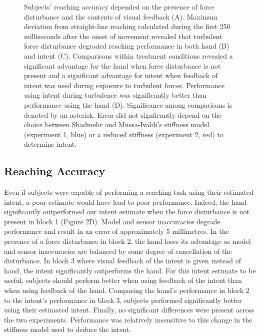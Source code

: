 \documentclass{frontiersSCNS} %
\begin{document}
\begin{figure}[t]
\centering
{}
\caption{Subjects' reaching accuracy depended on the presence of force disturbance and the contents of visual feedback (A). Maximum deviation from straight-line reaching calculated during the first 250 milliseconds after the onset of movement revealed that turbulent force disturbance degraded reaching performance in both hand (B) and intent (C). Comparisons within treatment conditions revealed a significant advantage for the hand when force disturbance is not present and a significant advantage for intent when feedback of intent was used during exposure to turbulent forces. Performance using intent during turbulence was significantly better than performance using the hand (D). Significance among comparisons is denoted by an asterisk. Error did not signficantly depend on the choice between Shadmehr and Mussa-Ivaldi's\cite{shadmehr1994adaptive} stiffness model (experiment 1, blue) or a reduced stiffness (experiment 2, red) to determine intent.}
\label{error}
\end{figure}

\subsection*{Reaching Accuracy}
Even if subjects were capable of performing a reaching task using their estimated intent, a poor estimate would have lead to poor performance. Indeed, the hand significantly outperformed our intent estimate when the force disturbance is not present in block 1 (Figure 2D). Model and sensor inaccuracies degrade performance and result in an error of approximately 5 millimetres. In the presence of a force disturbance in block 2, the hand loses its advantage as model and sensor inaccuracies are balanced by some degree of cancellation of the disturbance. In block 3 where visual feedback of the intent is given instead of hand, the intent significantly outperforms the hand. For this intent estimate to be useful, subjects should perform better when using feedback of the intent than when using feedback of the hand. Comparing the hand's performance in block 2 to the intent's performance in block 3, subjects performed significantly better using their estimated intent. Finally, no significant differences were present across the two experiments. Performance was relatively insensitive to this change in the stiffness model used to deduce the intent.
\end{document}
